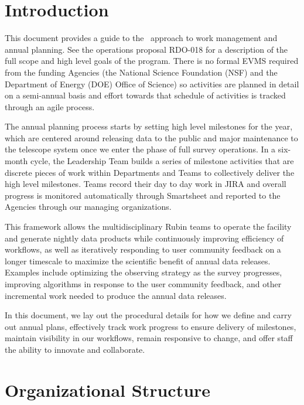 \section{Introduction}

This document provides a guide to the \VRO\ approach to work management and annual planning.
See the operations proposal RDO-018 for a description of the full scope and high level goals of the program.
There is no formal \gls{EVMS} required from the funding Agencies (the National Science Foundation (NSF) and the Department of Energy (DOE) Office of Science) so activities are planned in detail on a semi-annual basis and effort towards that schedule of activities is tracked through an agile process.

The annual planning process starts by setting high level milestones for the year, which are centered around releasing data to the public and major maintenance to the telescope system once we enter the phase of full survey operations.
In a six-month cycle, the Leadership Team builds a series of milestone activities that are discrete pieces of work within Departments and Teams to collectively deliver the high level milestones.
Teams record their day to day work in \gls{JIRA} and overall progress is monitored automatically through Smartsheet and reported to the Agencies through our managing organizations.

This framework allows the multidisciplinary Rubin teams to operate the facility and generate nightly data products while continuously improving efficiency of workflows,
as well as iteratively responding to user community feedback on a longer timescale to maximize the scientific benefit of annual data releases.
Examples include optimizing the observing strategy as the survey progresses, improving algorithms in response to the user community feedback,
and other incremental work needed to produce the annual data releases.

In this document, we lay out the procedural details for how we define and carry out annual plans, effectively track work progress to ensure delivery of milestones, maintain visibility in our workflows, remain responsive to change, and offer staff the ability to innovate and collaborate.


\section{Organizational Structure}
\label{sec:structure}

